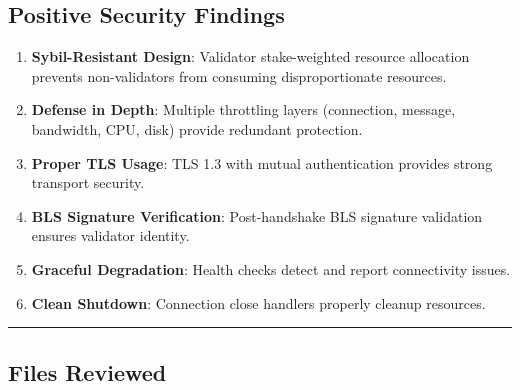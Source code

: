 \documentclass[
]{article}
\begin{document}
\subsection{Positive Security
Findings}\label{positive-security-findings}

\begin{enumerate}
\def\labelenumi{\arabic{enumi}.}
\item
  \textbf{Sybil-Resistant Design}: Validator stake-weighted resource
  allocation prevents non-validators from consuming disproportionate
  resources.
\item
  \textbf{Defense in Depth}: Multiple throttling layers (connection,
  message, bandwidth, CPU, disk) provide redundant protection.
\item
  \textbf{Proper TLS Usage}: TLS 1.3 with mutual authentication provides
  strong transport security.
\item
  \textbf{BLS Signature Verification}: Post-handshake BLS signature
  validation ensures validator identity.
\item
  \textbf{Graceful Degradation}: Health checks detect and report
  connectivity issues.
\item
  \textbf{Clean Shutdown}: Connection close handlers properly cleanup
  resources.
\end{enumerate}

\begin{center}\rule{0.5\linewidth}{0.5pt}\end{center}

\subsection{Files Reviewed}\label{files-reviewed}
\end{document}
